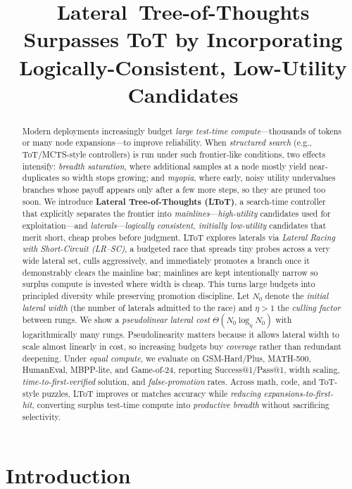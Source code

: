 \documentclass{article}
\title{Lateral~Tree\mbox{-}of\mbox{-}Thoughts Surpasses ToT by Incorporating Logically\mbox{-}Consistent, Low\mbox{-}Utility Candidates}
\begin{document}
\maketitle

\begin{abstract}
Modern deployments increasingly budget \emph{large test-time compute}---thousands of tokens or many node expansions---to improve reliability. When \emph{structured search} (e.g., ToT/MCTS-style controllers) is run under such frontier-like conditions, two effects intensify: \emph{breadth saturation}, where additional samples at a node mostly yield near-duplicates so width stops growing; and \emph{myopia}, where early, noisy utility undervalues branches whose payoff appears only after a few more steps, so they are pruned too soon. We introduce \textbf{Lateral Tree-of-Thoughts (LToT)}, a search-time controller that explicitly separates the frontier into \emph{mainlines}---\emph{high-utility} candidates used for exploitation---and \emph{laterals}---\emph{logically consistent, initially low-utility} candidates that merit short, cheap probes before judgment. LToT explores laterals via \emph{Lateral Racing with Short-Circuit (LR--SC)}, a budgeted race that spreads tiny probes across a very wide lateral set, culls aggressively, and immediately promotes a branch once it demonstrably clears the mainline bar; mainlines are kept intentionally narrow so surplus compute is invested where width is cheap. This turns large budgets into principled diversity while preserving promotion discipline. Let $N_{0}$ denote the \emph{initial lateral width} (the number of laterals admitted to the race) and $\eta>1$ the \emph{culling factor} between rungs. We show a \emph{pseudolinear lateral cost} $\Theta(N_{0}\log_{\eta}N_{0})$ with logarithmically many rungs. Pseudolinearity matters because it allows lateral width to scale almost linearly in cost, so increasing budgets buy \emph{coverage} rather than redundant deepening. Under \emph{equal compute}, we evaluate on GSM-Hard/Plus, MATH-500, HumanEval, MBPP-lite, and Game-of-24, reporting Success@1/Pass@1, width scaling, \emph{time-to-first-verified} solution, and \emph{false-promotion} rates. Across math, code, and ToT-style puzzles, LToT improves or matches accuracy while \emph{reducing expansions-to-first-hit}, converting surplus test-time compute into \emph{productive breadth} without sacrificing selectivity.
\end{abstract}

\section{Introduction}\label{section:introduction}
\end{document}
